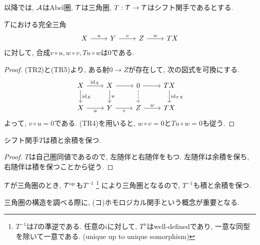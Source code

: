 \documentclass[uplatex, a4paper, 14Q, dvipdfmx]{jsarticle}
\begin{document}
以降では, $\mathcal{A}$はAbel圏, $\mathcal{T}$は三角圏, $T: \mathcal{T} \to \mathcal{T}$はシフト関手であるとする. 

\begin{lemma} \label{comp_zero}
  $\mathcal{T}$における完全三角
  \[\begin{tikzcd}
    X & Y & Z & TX
    \arrow["u", from=1-1, to=1-2]
    \arrow["v", from=1-2, to=1-3]
    \arrow["w", from=1-3, to=1-4]
  \end{tikzcd}\]
  に対して, 合成$v \circ u, w \circ v, Tu \circ w$は$0$である. 
\end{lemma}

\begin{proof}
  (TR2)と(TR5)より, ある射$0 \to Z$が存在して, 次の図式を可換にする. 
  \[\begin{tikzcd}
    X & X & 0 & TX \\
    X & Y & Z & TX
    \arrow["{\id_X}", from=1-1, to=1-2]
    \arrow[from=1-2, to=1-3]
    \arrow[from=1-3, to=1-4]
    \arrow["u"', from=2-1, to=2-2]
    \arrow["v"', from=2-2, to=2-3]
    \arrow["w", from=2-3, to=2-4]
    \arrow["{\id_X}", from=1-1, to=2-1]
    \arrow["u", from=1-2, to=2-2]
    \arrow[dashed, from=1-3, to=2-3]
    \arrow["{\id_{TX}}", from=1-4, to=2-4]
  \end{tikzcd}\]
  よって, $v \circ u = 0$である. 
  (TR4)を用いると, $w \circ v = 0$と$Tu \circ w = 0$も従う. 
\end{proof}

\begin{theorem} \label{preserve_limit}
  シフト関手$T$は積と余積を保つ. 
\end{theorem}

\begin{proof}
  $T$は自己圏同値であるので, 左随伴と右随伴をもつ. 
  左随伴は余積を保ち, 右随伴は積を保つことから従う. 
\end{proof}

\begin{remark}
  $\mathcal{T}$が三角圏のとき, $\mathcal{T}^{\mathrm{op}}$も$T^{-1}$
  \footnote{
    $T^{-1}$は$T$の準逆である. 
    任意の$i$に対して, $T^n$はwell-definedであり, 一意な同型を除いて一意である. (unique up to unique somorphism)
  }
  により三角圏となるので, $T^{-1}$も積と余積を保つ. 
\end{remark}

三角圏の構造を調べる際に, (コ)ホモロジカル関手という概念が重要となる. 
\end{document}
